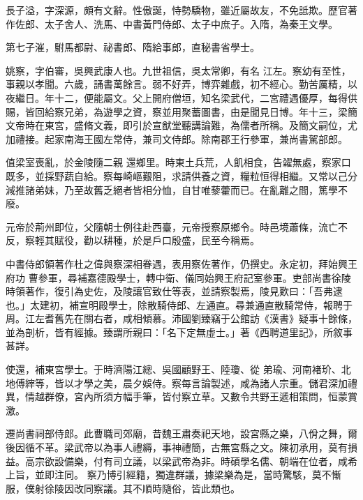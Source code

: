\begin{pinyinscope}
 長子溢，字深源，頗有文辭。性傲誕，恃勢驕物，雖近屬故友，不免詆欺。歷官著作佐郎、太子舍人、洗馬、中書黃門侍郎、太子中庶子。入隋，為秦王文學。



 第七子漼，駙馬都尉、祕書郎、隋給事郎，直秘書省學士。



 姚察，字伯審，吳興武康人也。九世祖信，吳太常卿，有名
 江左。察幼有至性，事親以孝聞。六歲，誦書萬餘言。弱不好弄，博弈雜戲，初不經心。勤苦厲精，以夜繼日。年十二，便能屬文。父上開府僧垣，知名梁武代，二宮禮遇優厚，每得供賜，皆回給察兄弟，為遊學之資，察並用聚蓄圖書，由是聞見日博。年十三，梁簡文帝時在東宮，盛脩文義，即引於宣猷堂聽講論難，為儒者所稱。及簡文嗣位，尤加禮接。起家南海王國左常侍，兼司文侍郎。除南郡王行參軍，兼尚書駕部郎。



 值梁室喪亂，於金陵隨二親
 還鄉里。時東土兵荒，人飢相食，告糴無處，察家口既多，並採野蔬自給。察每崎嶇艱阻，求請供養之資，糧粒恒得相繼。又常以己分減推諸弟妹，乃至故舊乏絕者皆相分恤，自甘唯藜藿而已。在亂離之間，篤學不廢。



 元帝於荊州即位，父隨朝士例往赴西臺，元帝授察原鄉令。時邑境蕭條，流亡不反，察輕其賦役，勸以耕種，於是戶口殷盛，民至今稱焉。



 中書侍郎領著作杜之偉與察深相眷遇，表用察佐著作，仍撰史。永定初，拜始興王府功
 曹參軍，尋補嘉德殿學士，轉中衛、儀同始興王府記室參軍。吏部尚書徐陵時領著作，復引為史佐，及陵讓官致仕等表，並請察製焉，陵見歎曰：「吾弗逮也。」太建初，補宣明殿學士，除散騎侍郎、左通直。尋兼通直散騎常侍，報聘于周。江左耆舊先在關右者，咸相傾慕。沛國劉臻竊于公館訪《漢書》疑事十餘條，並為剖析，皆有經據。臻謂所親曰：「名下定無虛士。」著《西聘道里記》，所敘事甚詳。



 使還，補東宮學士。于時濟陽江總、吳國顧野王、陸瓊、從
 弟瑜、河南褚玠、北地傅縡等，皆以才學之美，晨夕娛侍。察每言論製述，咸為諸人宗重。儲君深加禮異，情越群僚，宮內所須方幅手筆，皆付察立草。又數令共野王遞相策問，恒蒙賞激。



 遷尚書祠部侍郎。此曹職司郊廟，昔魏王肅奏祀天地，設宮縣之樂，八佾之舞，爾後因循不革。梁武帝以為事人禮縟，事神禮簡，古無宮縣之文。陳初承用，莫有損益。高宗欲設備樂，付有司立議，以梁武帝為非。時碩學名儒、朝端在位者，咸希上旨，並即注同。
 察乃博引經籍，獨違群議，據梁樂為是，當時驚駭，莫不慚服，僕射徐陵因改同察議。其不順時隨俗，皆此類也。




\end{pinyinscope}
